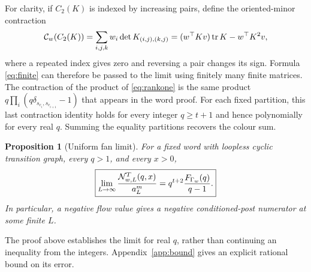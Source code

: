 \documentclass[11pt,a4paper]{article}
\newtheorem{proposition}[theorem]{Proposition}
\theoremstyle{remark}\newtheorem{remark}[theorem]{Remark}
\DeclareMathOperator{\tr}{tr}\DeclareMathOperator{\diag}{diag}
\begin{document}
For clarity, if $C_2(K)$ is indexed by increasing pairs, define the oriented-minor contraction
\begin{equation}\label{eq:contraction}
\CC_w(C_2(K))=\sum_{i,j,k}w_i\det K_{(i,j),(k,j)}
=(w^\top Kv)\tr K-w^\top K^2v,
\end{equation}
where a repeated index gives zero and reversing a pair changes its sign. Formula \eqref{eq:finite} can therefore be passed to the limit using finitely many finite matrices. The contraction of the product of \eqref{eq:rankone} is the same product $q\prod_i(q\delta_{s_{c_i},s_{c_{i+1}}}-1)$ that appears in the word proof. For each fixed partition, this last contraction identity holds for every integer $q\ge t+1$ and hence polynomially for every real $q$. Summing the equality partitions recovers the colour sum.

\begin{proposition}[Uniform fan limit]\label{prop:fanlimit}
For a fixed word with loopless cyclic transition graph, every $q>1$, and every $x>0$,
\begin{equation}\label{eq:limit}
\boxed{\displaystyle
\lim_{L\to\infty}\frac{\mathcal N_{w,L}^{T}(q,x)}{a_L^m}
=q^{t+2}\frac{F_{\Gamma_w}(q)}{q-1}.}
\end{equation}
In particular, a negative flow value gives a negative conditioned-post numerator at some finite $L$.
\end{proposition}
The proof above establishes the limit for real $q$, rather than continuing an inequality from the integers. Appendix~\ref{app:bound} gives an explicit rational bound on its error.
\end{document}
